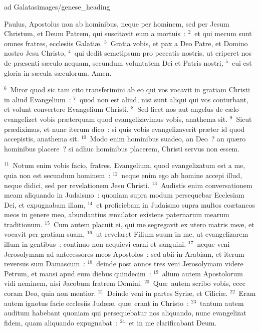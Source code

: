 {ad Galatas}{images/genese_heading}


\lettrine[lines=10,image=true,loversize=0.05,lraise=-0.03]{P}{}aulus, Apostolus non ab hominibus, neque per hominem, sed per Jesum Christum, et Deum Patrem, qui suscitavit eum a mortuis~:
${}^{2}$~et qui mecum sunt omnes fratres, ecclesiis Galati\ae .
${}^{3}$~Gratia vobis, et pax a Deo Patre, et Domino nostro Jesu Christo,
${}^{4}$~qui dedit semetipsum pro peccatis nostris, ut eriperet nos de pr\ae senti s\ae culo nequam, secundum voluntatem Dei et Patris nostri,
${}^{5}$~cui est gloria in s\ae cula s\ae culorum. Amen.


${}^{6}$~Miror quod sic tam cito transferimini ab eo qui vos vocavit in gratiam Christi in aliud Evangelium~:
${}^{7}$~quod non est aliud, nisi sunt aliqui qui vos conturbant, et volunt convertere Evangelium Christi.
${}^{8}$~Sed licet nos aut angelus de c\ae lo evangelizet vobis pr\ae terquam quod evangelizavimus vobis, anathema sit.
${}^{9}$~Sicut pr\ae diximus, et nunc iterum dico~: si quis vobis evangelizaverit pr\ae ter id quod accepistis, anathema sit.
${}^{10}$~Modo enim hominibus suadeo, an Deo~? an qu\ae ro hominibus placere~? si adhuc hominibus placerem, Christi servus non essem.


${}^{11}$~Notum enim vobis facio, fratres, Evangelium, quod evangelizatum est a me, quia non est secundum hominem~:
${}^{12}$~neque enim ego ab homine accepi illud, neque didici, sed per revelationem Jesu Christi.
${}^{13}$~Audistis enim conversationem meam aliquando in Judaismo~: quoniam supra modum persequebar Ecclesiam Dei, et expugnabam illam,
${}^{14}$~et proficiebam in Judaismo supra multos co\ae taneos meos in genere meo, abundantius \ae mulator existens paternarum mearum traditionum.
${}^{15}$~Cum autem placuit ei, qui me segregavit ex utero matris me\ae , et vocavit per gratiam suam,
${}^{16}$~ut revelaret Filium suum in me, ut evangelizarem illum in gentibus~: continuo non acquievi carni et sanguini,
${}^{17}$~neque veni Jerosolymam ad antecessores meos Apostolos~: sed abii in Arabiam, et iterum reversus sum Damascum~:
${}^{18}$~deinde post annos tres veni Jerosolymam videre Petrum, et mansi apud eum diebus quindecim~:
${}^{19}$~alium autem Apostolorum vidi neminem, nisi Jacobum fratrem Domini.
${}^{20}$~Qu\ae\ autem scribo vobis, ecce coram Deo, quia non mentior.
${}^{21}$~Deinde veni in partes Syri\ae , et Cilici\ae .
${}^{22}$~Eram autem ignotus facie ecclesiis Jud\ae \ae , qu\ae\ erant in Christo~:
${}^{23}$~tantum autem auditum habebant quoniam qui persequebatur nos aliquando, nunc evangelizat fidem, quam aliquando expugnabat~:
${}^{24}$~et in me clarificabant Deum.

